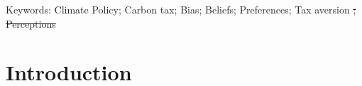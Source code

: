 \documentclass[12pt]{article} %
\providecommand{\DIFdeltex}[1]{{\protect\color{red}\sout{#1}}}                      %
\providecommand{\DIFdelbegin}{} %
\providecommand{\DIFdelend}{} %
\providecommand{\DIFdel}[1]{\texorpdfstring{\DIFdeltex{#1}}{}} %
\newcommand{\DIFscaledelfig}{0.5}
\newlength{\DIFdelgraphicswidth} %
\newlength{\DIFdelgraphicsheight} %
\newcommand{\DIFdelincludegraphics}[2][]{%
\sbox{\DIFdelgraphicsbox}{\DIFOincludegraphics[#1]{#2}}%
\settoboxwidth{\DIFdelgraphicswidth}{\DIFdelgraphicsbox} %
\settoboxtotalheight{\DIFdelgraphicsheight}{\DIFdelgraphicsbox} %
\scalebox{\DIFscaledelfig}{%
\parbox[b]{\DIFdelgraphicswidth}{\usebox{\DIFdelgraphicsbox}\\[-\baselineskip] \rule{\DIFdelgraphicswidth}{0em}}\llap{\resizebox{\DIFdelgraphicswidth}{\DIFdelgraphicsheight}{%
\setlength{\unitlength}{\DIFdelgraphicswidth}%
\begin{picture}(1,1)%
\thicklines\linethickness{2pt} %
{\color[rgb]{1,0,0}\put(0,0){\framebox(1,1){}}}%
{\color[rgb]{1,0,0}\put(0,0){\line( 1,1){1}}}%
{\color[rgb]{1,0,0}\put(0,1){\line(1,-1){1}}}%
\end{picture}%
}\hspace*{3pt}}} %
} %
\DeclareRobustCommand{\DIFdelbegin}{\DIFOdelbegin \let\includegraphics\DIFdelincludegraphics} %
\DeclareRobustCommand{\DIFdelend}{\DIFOaddend \let\includegraphics\DIFOincludegraphics} %
\begin{document}
Keywords: Climate Policy; Carbon tax; Bias; Beliefs; Preferences; Tax aversion \DIFdelbegin \DIFdel{; Perceptions %
}\DIFdelend %

\newpage

\newpage
\section{Introduction}


\end{document}
